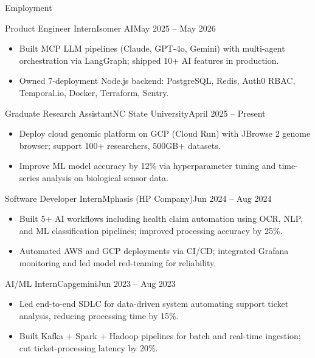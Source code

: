 \documentclass[]{mcdowellcv}
\begin{document}
\makeheader

\begin{cvsection}{Employment}
  \begin{cvsubsection}{Product Engineer Intern}{Isomer AI}{May 2025 -- May 2026}
    \begin{itemize}
      \item Built MCP LLM pipelines (Claude, GPT-4o, Gemini) with multi-agent orchestration via LangGraph; shipped 10+ AI features in production.
      \item Owned 7-deployment Node.js backend: PostgreSQL, Redis, Auth0 RBAC, Temporal.io, Docker, Terraform, Sentry.
    \end{itemize}
    \vspace{-1.5pt}
  \end{cvsubsection}

  \begin{cvsubsection}{Graduate Research Assistant}{NC State University}{April 2025 -- Present}
    \begin{itemize}
      \item Deploy cloud genomic platform on GCP (Cloud Run) with JBrowse 2 genome browser; support 100+ researchers, 500GB+ datasets.
      \item Improve ML model accuracy by 12\% via hyperparameter tuning and time-series analysis on biological sensor data.
    \end{itemize}
    \vspace{-1.5pt}
  \end{cvsubsection}

  \begin{cvsubsection}{Software Developer Intern}{Mphasis (HP Company)}{Jun 2024 -- Aug 2024}
    \begin{itemize}
      \item Built 5+ AI workflows including health claim automation using OCR, NLP, and ML classification pipelines; improved processing accuracy by 25\%.
      \item Automated AWS and GCP deployments via CI/CD; integrated Grafana monitoring and led model red-teaming for reliability.
    \end{itemize}
    \vspace{-1.5pt}
  \end{cvsubsection}

  \begin{cvsubsection}{AI/ML Intern}{Capgemini}{Jun 2023 -- Aug 2023}
    \begin{itemize}
      \item Led end-to-end SDLC for data-driven system automating support ticket analysis, reducing processing time by 15\%.
      \item Built Kafka + Spark + Hadoop pipelines for batch and real-time ingestion; cut ticket-processing latency by 20\%.
    \end{itemize}
    \vspace{-1.5pt}
  \end{cvsubsection}
\end{cvsection}
\end{document}
